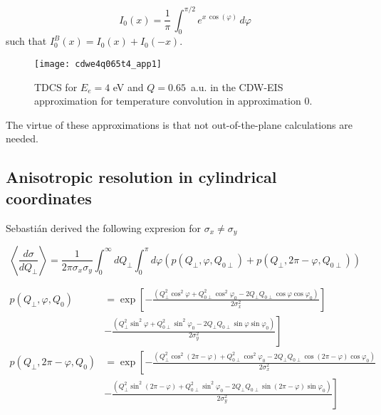\begin{equation}\label{Q:I0}
  I_{0}(x)= \frac{1}{\pi} \, \int_{0}^{\pi/2} e^{x \, \cos(\varphi)} \, d \varphi
\end{equation}
%
such that $I^{B}_{0}(x) = I_{0}(x) + I_{0}(-x)$.


\begin{figure}[!htpb]
  \centering
\texttt{[image: cdwe4q065t4\_app1]}
  \caption{TDCS for $E_{e}=4$ eV and $Q=0.65$~a.u. in the CDW-EIS approximation for temperature convolution in approximation 0.}
  \label{F:cdwe4q065t4_app1}
\end{figure}

The virtue of these approximations is that not out-of-the-plane calculations are needed.


\subsection{Anisotropic resolution in cylindrical coordinates}
\label{S:anis-resol-cylin-coord}

Sebasti\'{a}n derived the following expresion for $\sigma_{x}\neq \sigma_{y}$

\[
\left\langle \frac{d \sigma }{dQ_{\perp}} \right\rangle = \frac{1}{2\pi
  \sigma_{x} \sigma_{y}} \int_{0}^{\infty} dQ_{\perp} \int_{0}^{\pi} d\varphi
\left(p (Q_{\perp },\varphi ,Q_{0\perp}) + p(Q_{\perp },2\pi -\varphi
  ,Q_{0\perp}) \right)
\]

\begin{align*}
  p(Q_{\perp },\varphi ,Q_{0}) &=\exp \left[ -\frac{(Q_{\perp }^{2}\cos
      ^{2}\varphi +Q_{0\perp }^{2}\cos ^{2}\varphi _{0}-2Q_{\perp }Q_{0\perp }\cos
      \varphi \cos \varphi _{0})}{2\sigma _{x}^{2}} \right] 
  \\
  & \left.  - \frac{(Q_{\perp }^{2} \sin^{2}\varphi +Q_{0\perp }^{2}\sin ^{2}\varphi _{0}-2Q_{\perp }Q_{0\perp }\sin
      \varphi \sin \varphi _{0})}{2\sigma _{y}^{2}}\right]  \\
  p(Q_{\perp },2\pi -\varphi ,Q_{0}) 
  &=\exp \left[ - \frac{(Q_{\perp }^{2}\cos^{2} \left( 2\pi -\varphi \right) +Q_{0\perp }^{2} \cos ^{2}\varphi_{0} - 
      2Q_{\perp }Q_{0\perp }\cos \left( 2\pi -\varphi \right) \cos \varphi_{0})} {2\sigma_{x}^{2}} \right.  \\
  & \left. - \frac{(Q_{\perp }^{2}\sin ^{2}\left( 2\pi -\varphi \right) + Q_{0\perp }^{2}\sin ^{2}\varphi _{0}-2Q_{\perp }Q_{0\perp } 
      \sin\left( 2\pi -\varphi \right) \sin \varphi _{0})}{2\sigma _{y}^{2}}\right] 
\end{align*}

